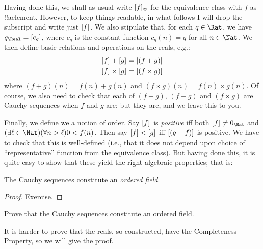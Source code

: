 \documentclass[../../../include/open-logic-section]{subfiles}
\begin{document}
Having done this, we shall as usual write $[f]_{\Bumpeq}$
for the equivalence class with $f$ as !!a{element}. However, to keep
things readable, in what follows I will drop the subscript and write
just $[f]_{}$. We also stipulate that, for each $q \in \Rat$,
we have $q_{\Real} = \equivrep{c_{q}}{}$, where $c_{q}$ is the
constant function $c_q(n) = q$ for all $n \in \Nat$. We then define
basic relations and operations on the reals, e.g.:
\begin{align*}
	\equivrep{f}{} + \equivrep{g}{} &= 	\equivrep{(f + g)}{} \\
	\equivrep{f}{} \times 	\equivrep{g}{} &= \equivrep{(f \times g)}{} 
\end{align*}
where $(f + g)(n) = f(n) + g(n)$ and $(f \times g)(n) = f(n) \times
g(n)$. Of course, we also need to check that each of  $(f + g)$,
$(f-g)$ and $(f\times g)$ are Cauchy sequences when $f$ and $g$ are;
but they are, and we leave this to you.

Finally, we define we a notion of order. Say $[f]_{}$ is
\emph{positive} iff both $\equivrep{f}{}\neq 0_\Rat$ and $(\exists
\ell \in \Nat)(\forall n > \ell)0 < f(n)$. Then say $[f]_{} <
[g]_{}$ iff $[(g - f)]_{}$ is positive. We have to
check that this is well-defined (i.e., that it does not depend upon
choice of ``representative'' function from the equivalence class). 
But having done this, it is quite easy to show that these yield the
right algebraic properties; that is:
\begin{thm}
The Cauchy sequences constitute an \emph{ordered field}.
\end{thm}

\begin{proof}
Exercise. 
\end{proof}

\begin{prob}
Prove that the Cauchy sequences constitute an ordered field.
\end{prob}

It is harder to prove that the reals, so constructed, have the
Completeness Property, so we will give the proof.
\end{document}
